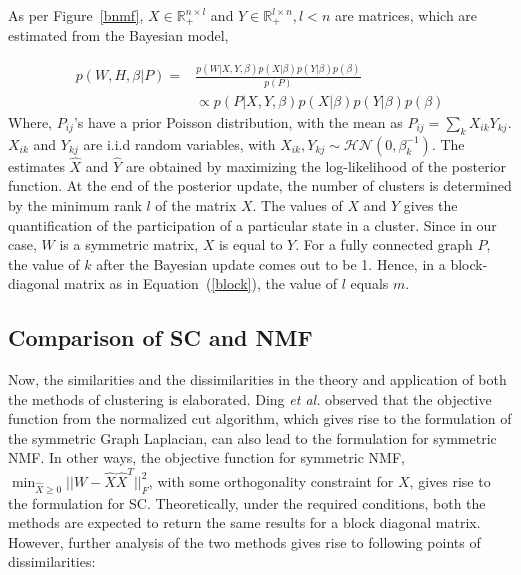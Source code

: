 As per Figure~\ref{bnmf}, $X \in \mathbb{R}^{n \times l}_+$ and $Y \in \mathbb{R}^{l \times n}_+, l<n$ are matrices, which are estimated from the Bayesian model,

\begin{equation}
\begin{array}{ll}
p(W,H,\beta|P) =& \displaystyle \frac{p(W|X,Y,\beta)p(X|\beta)p(Y|\beta)p(\beta)}{p(P)} \\
& \propto p(P|X,Y,\beta)p(X|\beta)p(Y|\beta)p(\beta)
\end{array}
\end{equation}
Where, $P_{ij}$'s have a prior Poisson distribution, with the mean as $P_{ij} = \sum_k X_{ik} Y_{kj}$. $X_{ik}$ and $Y_{kj}$ are i.i.d random variables, with $X_{ik},Y_{kj} \sim \mathcal{HN} (0,\beta_k^{-1})$. The estimates $\hat{X}$ and $\hat{Y}$ are obtained by maximizing the log-likelihood of the posterior function. At the end of the posterior update, the number of clusters is determined by the minimum rank $l$ of the matrix $X$. The values of $X$ and $Y$ gives the quantification of the participation of a particular state in a cluster. Since in our case, $W$ is a symmetric matrix, $X$ is equal to $Y$. For a fully connected graph $P$, the value of $k$ after the Bayesian update comes out to be 1. Hence, in a block-diagonal matrix as in Equation~(\ref{block}), the value of $l$ equals $m$.  

\subsection{Comparison of SC and NMF}

Now, the similarities and the dissimilarities in the theory and application of both the methods of clustering is elaborated. Ding \textit{et al.} observed that the objective function from the normalized cut algorithm, which gives rise to the formulation of the symmetric Graph Laplacian, can also lead to the formulation for symmetric NMF. In other ways, the objective function for symmetric NMF, $\min_{\hat{X} \geq 0} \bigg| \bigg| W - \hat{X}\hat{X}^T \bigg| \bigg|_{F}^2$, with some orthogonality constraint for $X$, gives rise to the formulation for SC. Theoretically, under the required conditions, both the methods are expected to return the same results for a block diagonal matrix. However, further analysis of the two methods gives rise to following points of dissimilarities:

